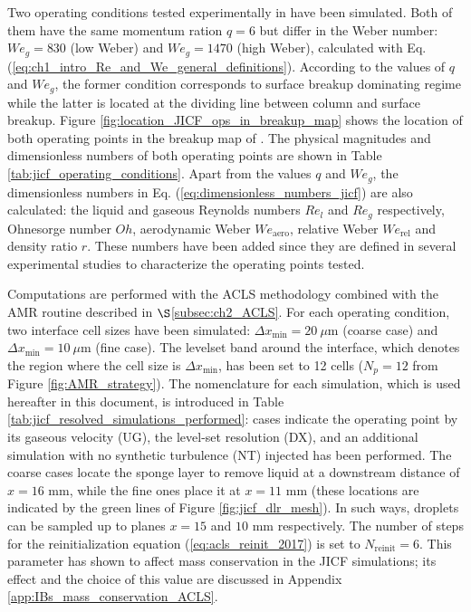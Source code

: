Two operating conditions tested experimentally in  have been simulated. Both of them have the same momentum ration $q = 6$ but differ in the Weber number: $We_g = 830$ (low Weber) and $We_g = 1470$ (high Weber), calculated with Eq. (\ref{eq:ch1_intro_Re_and_We_general_definitions}). According to the values of $q$ and $We_g$, the former condition corresponds to surface breakup dominating regime while the latter is located at the dividing line between column and surface breakup. Figure \ref{fig:location_JICF_ops_in_breakup_map} shows the location of both operating points in the breakup map of \citeColor[wu_breakup_1997]. The physical magnitudes and dimensionless numbers of both operating points are shown in Table \ref{tab:jicf_operating_conditions}. Apart from the values $q$ and $We_g$, the dimensionless numbers in  Eq. (\ref{eq:dimensionless_numbers_jicf}) are also calculated: the liquid and gaseous Reynolds numbers $Re_l$ and $Re_g$ respectively, Ohnesorge number $Oh$, aerodynamic Weber $We_\mathrm{aero}$, relative Weber $We_\mathrm{rel}$ and density ratio $r$. These numbers have been added since they are defined in several experimental studies  to characterize the operating points tested. 

Computations are performed with the ACLS methodology combined with the AMR routine described in $\S$\ref{subsec:ch2_ACLS}. For each operating condition, two interface cell sizes have been simulated: $\Delta x_\mathrm{min} = 20 ~\mu$m (coarse case) and $\Delta x_\mathrm{min} = 10 ~\mu$m (fine case). The levelset band around the interface, which denotes the region where the cell size is $\Delta x_\mathrm{min}$, has been set to 12 cells ($N_p = 12$ from Figure \ref{fig:AMR_strategy}). The nomenclature for each simulation, which is used hereafter in this document, is introduced in Table \ref{tab:jicf_resolved_simulations_performed}: cases indicate the operating point by its gaseous velocity (UG), the level-set resolution (DX), and an additional simulation with no synthetic turbulence (NT) injected has been performed.  The coarse cases locate the sponge layer to remove liquid at a downstream distance of $x = 16$ mm, while the fine ones place it at $x = 11$ mm (these locations are indicated by the green lines of Figure \ref{fig:jicf_dlr_mesh}). In such ways, droplets can be sampled up to planes $x = 15$ and $10$ mm respectively. The number of steps for the reinitialization equation (\ref{eq:acls_reinit_2017}) is set to $N_\mathrm{reinit} = 6$. This parameter has shown to affect mass conservation in the JICF simulations; its effect and the choice of this value are discussed in Appendix \ref{app:IBs_mass_conservation_ACLS}.


